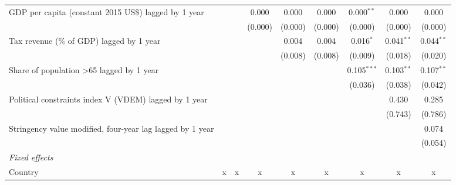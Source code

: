 \begin{tabular}{lcccccccc}
   GDP per capita (constant 2015 US\$) lagged by 1 year                   &              &              & 0.000        & 0.000        & 0.000        & 0.000$^{**}$  & 0.000        & 0.000\\   
                                                                          &              &              & (0.000)      & (0.000)      & (0.000)      & (0.000)       & (0.000)      & (0.000)\\   
   Tax revenue (\% of GDP) lagged by 1 year                               &              &              &              & 0.004        & 0.004        & 0.016$^{*}$   & 0.041$^{**}$ & 0.044$^{**}$\\   
                                                                          &              &              &              & (0.008)      & (0.008)      & (0.009)       & (0.018)      & (0.020)\\   
   Share of population >65 lagged by 1 year                               &              &              &              &              &              & 0.105$^{***}$ & 0.103$^{**}$ & 0.107$^{**}$\\   
                                                                          &              &              &              &              &              & (0.036)       & (0.038)      & (0.042)\\   
   Political constraints index V (VDEM) lagged by 1 year                  &              &              &              &              &              &               & 0.430        & 0.285\\   
                                                                          &              &              &              &              &              &               & (0.743)      & (0.786)\\   
   Stringency value modified, four-year lag lagged by 1 year              &              &              &              &              &              &               &              & 0.074\\   
                                                                          &              &              &              &              &              &               &              & (0.054)\\   
   \emph{Fixed effects}\\
   Country                                                                & x            & x            & x            & x            & x            & x             & x            & x\\  

\end{tabular}
